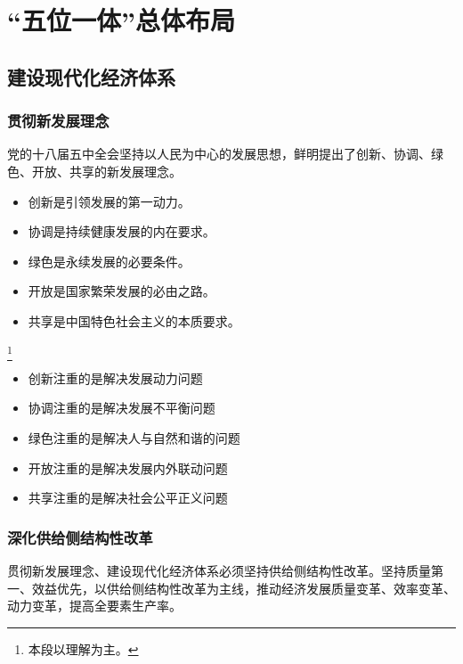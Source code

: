 \chapter{“五位一体”总体布局}


\section{建设现代化经济体系}
    \subsection{贯彻新发展理念}
        党的十八届五中全会坚持以人民为中心的发展思想，鲜明提出了创新、协调、绿色、开放、共享的新发展理念。

        \begin{itemize}
            \item 创新是引领发展的第一动力。
            \item 协调是持续健康发展的内在要求。
            \item 绿色是永续发展的必要条件。
            \item 开放是国家繁荣发展的必由之路。
            \item 共享是中国特色社会主义的本质要求。
        \end{itemize}

        \footnote{本段以理解为主。}
        \begin{itemize}
            \item 创新注重的是解决发展动力问题
            \item 协调注重的是解决发展不平衡问题
            \item 绿色注重的是解决人与自然和谐的问题
            \item 开放注重的是解决发展内外联动问题
            \item 共享注重的是解决社会公平正义问题
        \end{itemize}

    \subsection{深化供给侧结构性改革}
        贯彻新发展理念、建设现代化经济体系必须坚持供给侧结构性改革。坚持质量第一、效益优先，以供给侧结构性改革为主线，推动经济发展质量变革、效率变革、动力变革，提高全要素生产率。

